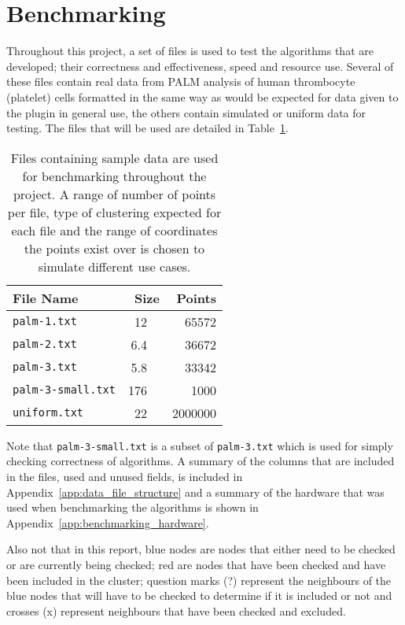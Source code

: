 
\section{Benchmarking}
\label{sec:benchmarking}

Throughout this project, a set of files is used to test the algorithms that are
developed; their correctness and effectiveness, speed and resource use.
Several of these files contain real data from PALM analysis of human
thrombocyte (platelet) cells formatted in the same way as would be expected for
data given to the plugin in general use, the others contain simulated or
uniform data for testing. The files that will be used are detailed in
Table~\ref{tab:benchmarking-files}.

\renewcommand{\arraystretch}{1.3}
\begin{table}[htbp]
\centering
\begin{tabular} {l r r}
	\toprule
	File Name & Size & Points \\
	\midrule
	\texttt{palm-1.txt} & \SI{12}{\mebi\byte} & 65572 \\
	\texttt{palm-2.txt} & \SI{6.4}{\mebi\byte} & 36672 \\
	\texttt{palm-3.txt} & \SI{5.8}{\mebi\byte} & 33342 \\
	\texttt{palm-3-small.txt} & \SI{176}{\kibi\byte} & 1000 \\
	\texttt{uniform.txt} & \SI{22}{\mebi\byte} & 2000000 \\
	\bottomrule
\end{tabular}

\caption[Sample data files used for testing and benchmarking.]{Files containing
	sample data are used for benchmarking throughout the project. A range of
	number of points per file, type of clustering expected for each file and
	the range of coordinates the points exist over is chosen to simulate
	different use cases.}\label{tab:benchmarking-files}
\end{table}

Note that \texttt{palm-3-small.txt} is a subset of \texttt{palm-3.txt} which
is used for simply checking correctness of algorithms. A summary of the
columns that are included in the files, used and unused fields, is included in
Appendix~\ref{app:data_file_structure} and a summary of the hardware that was
used when benchmarking the algorithms is shown in
Appendix~\ref{app:benchmarking_hardware}.

Also not that in this report, blue nodes are nodes that either need to be
checked or are currently being checked; red are nodes that have been checked
and have been included in the cluster; question marks ({\footnotesize?})
represent the neighbours of the blue nodes that will have to be checked to
determine if it is included or not and crosses ({\footnotesize x}) represent
neighbours that have been checked and excluded.
